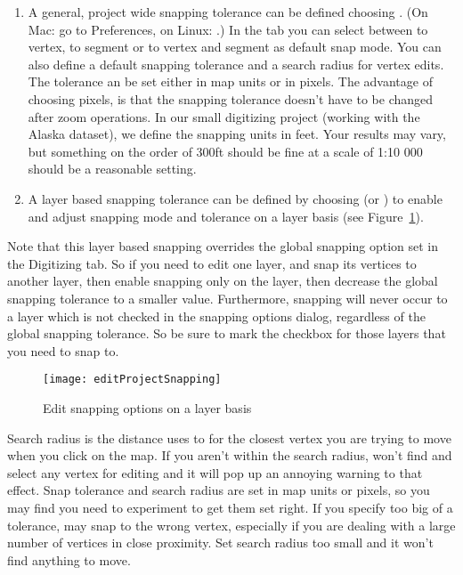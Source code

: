 \begin{enumerate}
\item A general, project wide snapping tolerance can be defined choosing
 \arrow {}.
(On Mac: go to  \mainmenuopt{\qg} \arrow Preferences, on Linux: 
 \arrow {}.)
In the  tab you can select between to vertex, to segment or
to vertex and segment as default snap mode. You can also define a default
snapping tolerance and a search radius for vertex edits. The tolerance an be
set either in map units or in pixels. The advantage of choosing pixels, is
that the snapping tolerance doesn't have to be changed after zoom operations.
In our small digitizing project (working with the Alaska dataset), we define
the snapping units in feet. Your results may vary, but something on the order
of 300ft should be fine at a scale of 1:10 000 should be a reasonable
setting.
\item A layer based snapping tolerance can be defined by choosing
 (or ) \arrow 
{} to enable and adjust snapping mode and tolerance 
on a layer basis (see Figure~\ref{fig:snappingoptions}).
\end{enumerate}
Note that this layer based snapping overrides the global snapping option set in the Digitizing tab. So if you need to edit one layer, and snap its vertices to another layer, then enable snapping only on the  layer, then decrease the global snapping tolerance to a smaller value.  Furthermore, snapping will never occur to a layer which is not checked in the snapping options dialog, regardless of the global snapping tolerance. So be sure to mark the checkbox for those layers that you need to snap to.

\begin{figure}[ht]
   \centering
   \texttt{[image: editProjectSnapping]}
   \caption{Edit snapping options on a layer basis \nixcaption}
   \label{fig:snappingoptions}
\end{figure}


Search radius is the distance \qg uses to  for the closest
vertex you are trying to move when you click on the
map. If you aren't within the search radius, \qg won't find and select
any vertex for editing and it will pop up an annoying warning to that effect.
Snap tolerance and search radius are set in map units or pixels, so you may find you
need to experiment to get them set right. If you specify too big of a
tolerance, \qg may snap to the wrong vertex, especially if you are dealing
with a large number of vertices in close proximity. Set search radius too
small and it won't find anything to move.


